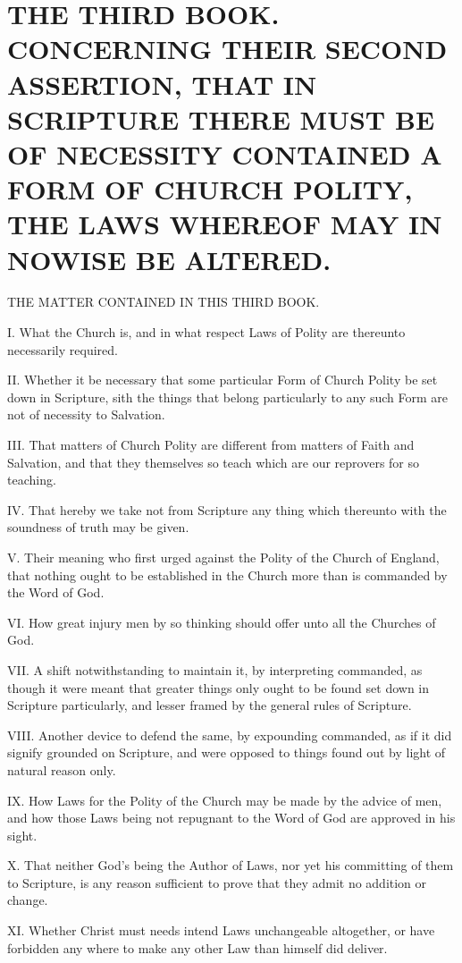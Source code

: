 \chapter*[The Third Book]{THE THIRD BOOK. 
CONCERNING THEIR SECOND ASSERTION, THAT IN SCRIPTURE THERE MUST BE OF NECESSITY CONTAINED A FORM OF CHURCH POLITY, THE LAWS WHEREOF MAY IN NOWISE BE ALTERED.}
\label{chap:book3}

THE MATTER CONTAINED IN THIS THIRD BOOK.

I. What the Church is, and in what respect Laws of Polity are thereunto necessarily required.

II. Whether it be necessary that some particular Form of Church Polity be set down in Scripture, sith the things that belong particularly to any such Form are not of necessity to Salvation.

III. That matters of Church Polity are different from matters of Faith and Salvation, and that they themselves so teach which are our reprovers for so teaching.

IV. That hereby we take not from Scripture any thing which thereunto with the soundness of truth may be given.

V. Their meaning who first urged against the Polity of the Church of England, that nothing ought to be established in the Church more than is commanded by the Word of God.

VI. How great injury men by so thinking should offer unto all the Churches of God.

VII. A shift notwithstanding to maintain it, by interpreting commanded, as though it were meant that greater things only ought to be found set down in Scripture particularly, and lesser framed by the general rules of Scripture.

VIII. Another device to defend the same, by expounding commanded, as if it did signify grounded on Scripture, and were opposed to things found out by light of natural reason only.

IX. How Laws for the Polity of the Church may be made by the advice of men, and how those Laws being not repugnant to the Word of God are approved in his sight.

X. That neither God’s being the Author of Laws, nor yet his committing of them to Scripture, is any reason sufficient to prove that they admit no addition or change.

XI. Whether Christ must needs intend Laws unchangeable altogether, or have forbidden any where to make any other Law than himself did deliver.

